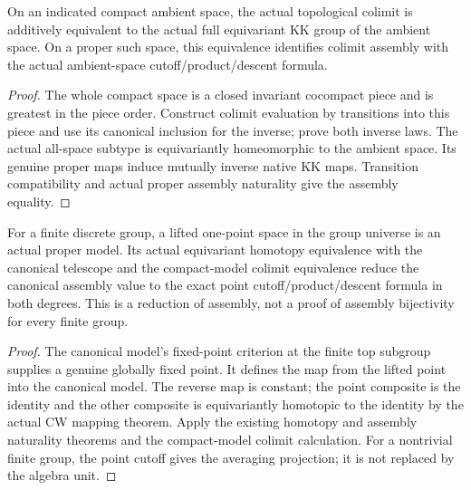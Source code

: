 \begin{proposition}\label{prop:compact-model-colimit-calibration}
\leanok
On an indicated compact ambient space, the actual topological colimit is
additively equivalent to the actual full equivariant KK group of the ambient
space. On a proper such space, this equivalence identifies colimit assembly
with the actual ambient-space cutoff/product/descent formula.
\end{proposition}
\begin{proof}
\leanok
The whole compact space is a closed invariant cocompact piece and is greatest
in the piece order. Construct colimit evaluation by transitions into this
piece and use its canonical inclusion for the inverse; prove both inverse
laws. The actual all-space subtype is equivariantly homeomorphic to the
ambient space. Its genuine proper maps induce mutually inverse native KK
maps. Transition compatibility and actual proper assembly naturality give
the assembly equality.
\end{proof}

\begin{proposition}\label{prop:finite-group-point-reduction}
\leanok
For a finite discrete group, a lifted one-point space in the group universe
is an actual proper model. Its actual equivariant homotopy equivalence with
the canonical telescope and the compact-model colimit equivalence reduce
the canonical assembly value to the exact point cutoff/product/descent
formula in both degrees. This is a reduction of assembly, not a proof of
assembly bijectivity for every finite group.
\end{proposition}
\begin{proof}
\leanok
The canonical model's fixed-point criterion at the finite top subgroup
supplies a genuine globally fixed point. It defines the map from the lifted
point into the canonical model. The reverse map is constant; the point
composite is the identity and the other composite is equivariantly homotopic
to the identity by the actual CW mapping theorem. Apply the existing
homotopy and assembly naturality theorems and the compact-model colimit
calculation. For a nontrivial finite group, the point cutoff gives the
averaging projection; it is not replaced by the algebra unit.
\end{proof}

